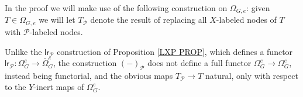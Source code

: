 \documentclass[a4paper,10pt]{article}%
\begin{document}
In the proof we will make use of the following construction on 
$\Omega_{G,e}$: given $T \in \Omega_{G,e}$ we will let $T_{\mathcal{P}}$ denote the result of replacing all $X$-labeled nodes of $T$ with $\mathcal{P}$-labeled nodes.

\begin{remark}\label{YINERT REM}
  Unlike the $\mathsf{lr}_{\mathcal{P}}$ construction of Proposition \ref{LXP PROP}, which defines a functor 
  $\mathsf{lr}_{\mathcal{P}} \colon
  \Omega_G^e \to \bar{\Omega}_G^e $,
  the construction 
  $(\minus)_{\mathcal{P}}$ does not define a full functor
  $\Omega_G^e \to \Omega_G^e$, instead being functorial, and the obvious maps $T_{\mathcal{P}} \to T$ natural, only with respect to the $Y$-inert maps of $\Omega_G^e$.
\end{remark}
\end{document}

